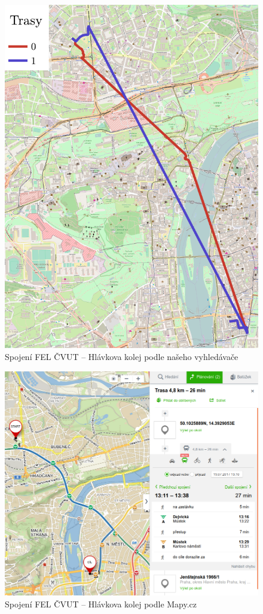 \begin{figure}[h]
  \centering
    \includegraphics[width=\textwidth]{../img/fel-hlavkova-osmawalk.pdf}
  \caption{Spojení FEL ČVUT -- Hlávkova kolej podle našeho vyhledávače}
  \label{fig:fel-hlavkova-osmawalk}
\end{figure}
\begin{figure}[h]
  \centering
    \includegraphics[width=\textwidth]{../img/fel-hlavkova-seznam.png}
  \caption{Spojení FEL ČVUT -- Hlávkova kolej podle Mapy.cz}
  \label{fig:fel-hlavkova-seznam}
\end{figure}
